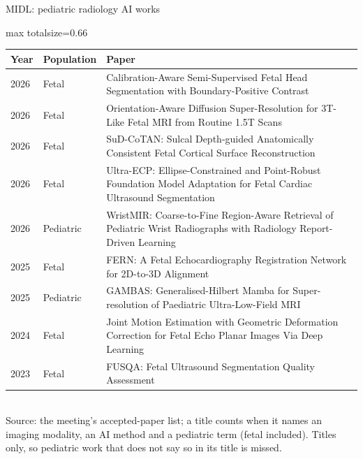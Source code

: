 \documentclass[aspectratio=169]{beamer}
\renewcommand{\arraystretch}{1.08}
\begin{document}
\begin{frame}[category=Conferences]{MIDL: pediatric radiology AI works}
\vspace{2pt}
\tiny
\begin{adjustbox}{max totalsize={\textwidth}{0.66\textheight}}
\renewcommand{\arraystretch}{1.2}
\begin{tabular}{|l|l|>{\raggedright\arraybackslash}p{}|}
\hline \textbf{Year} & \textbf{Population} & \textbf{Paper} \\ \hline
2026 & Fetal & Calibration-Aware Semi-Supervised Fetal Head Segmentation with Boundary-Positive Contrast \\ \hline
2026 & Fetal & Orientation-Aware Diffusion Super-Resolution for 3T-Like Fetal MRI from Routine 1.5T Scans \\ \hline
2026 & Fetal & SuD-CoTAN: Sulcal Depth-guided Anatomically Consistent Fetal Cortical Surface Reconstruction \\ \hline
2026 & Fetal & Ultra-ECP: Ellipse-Constrained and Point-Robust Foundation Model Adaptation for Fetal Cardiac Ultrasound Segmentation \\ \hline
2026 & Pediatric & WristMIR: Coarse-to-Fine Region-Aware Retrieval of Pediatric Wrist Radiographs with Radiology Report-Driven Learning \\ \hline
2025 & Fetal & FERN: A Fetal Echocardiography Registration Network for 2D-to-3D Alignment \\ \hline
2025 & Pediatric & GAMBAS: Generalised-Hilbert Mamba for Super-resolution of Paediatric Ultra-Low-Field MRI \\ \hline
2024 & Fetal & Joint Motion Estimation with Geometric Deformation Correction for Fetal Echo Planar Images Via Deep Learning \\ \hline
2023 & Fetal & FUSQA: Fetal Ultrasound Segmentation Quality Assessment \\ \hline
\end{tabular}
\end{adjustbox}
\\[2pt]
{\tiny Source: the meeting's accepted-paper list; a title counts when it names an imaging modality, an AI method and a pediatric term (fetal included). Titles only, so pediatric work that does not say so in its title is missed.}
\end{frame}
\end{document}
